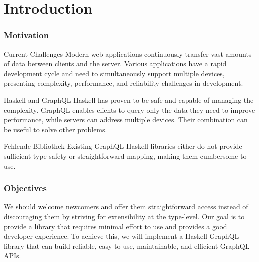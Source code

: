 \section{Introduction}

\begin{frame}\frametitle{Motivation}

    \footnotesize

    \begin{alertblock}{Current Challenges}
        Modern web applications continuously transfer vast amounts of data between clients and the server. Various applications have a rapid development cycle and need to simultaneously support multiple devices, presenting complexity, performance, and reliability challenges in development. 
    \end{alertblock}

    \begin{alertblock}{Haskell and  GraphQL}
        Haskell has proven to be safe and capable of managing the complexity. GraphQL enables clients to query only the data they need to improve performance, while servers can address multiple devices. Their combination can be useful to solve other problems.
    \end{alertblock}

    \begin{block}{Fehlende Bibliothek}
        Existing GraphQL Haskell libraries either do not provide sufficient type safety or straightforward mapping, making them cumbersome to use.
    \end{block}

\end{frame}

\begin{frame}\frametitle{Objectives}

We should welcome newcomers and offer them straightforward access instead of discouraging them by striving for extensibility at the type-level.  Our goal is to provide a library that requires minimal effort to use and provides a good developer experience. To achieve this, we will implement a Haskell GraphQL library that can build reliable, easy-to-use, maintainable, and efficient GraphQL APIs.

\end{frame}